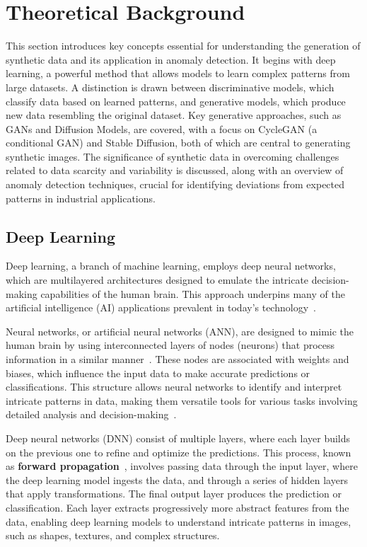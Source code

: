 \documentclass[12pt,DIV14,BCOR12mm,a4paper,footinclude=false,headinclude,parskip=half-,twoside,openright,cleardoublepage=empty,toc=index,bibliography=totoc,listof=totoc]{scrreprt}
\numberwithin{equation}{chapter}
\begin{document}
\chapter{Theoretical Background}
\label{chapter2}
This section introduces key concepts essential for understanding the generation of synthetic data and its application in anomaly detection. It begins with deep learning, a powerful method that allows models to learn complex patterns from large datasets. A distinction is drawn between discriminative models, which classify data based on learned patterns, and generative models, which produce new data resembling the original dataset. Key generative approaches, such as GANs and Diffusion Models, are covered, with a focus on CycleGAN (a conditional GAN) and Stable Diffusion, both of which are central to generating synthetic images. The significance of synthetic data in overcoming challenges related to data scarcity and variability is discussed, along with an overview of anomaly detection techniques, crucial for identifying deviations from expected patterns in industrial applications.
\section{Deep Learning}
Deep learning, a branch of machine learning, employs deep neural networks, which are multilayered architectures designed to emulate the intricate decision-making capabilities of the human brain. This approach underpins many of the artificial intelligence (AI) applications prevalent in today’s technology~\cite{wuttke2024}.

Neural networks, or artificial neural networks (ANN), are designed to mimic the human brain by using interconnected layers of nodes (neurons) that process information in a similar manner~\cite{maind2014research}. These nodes are associated with weights and biases, which influence the input data to make accurate predictions or classifications. This structure allows neural networks to identify and interpret intricate patterns in data, making them versatile tools for various tasks involving detailed analysis and decision-making~\cite{hardesty2017explained, maind2014research}.

Deep neural networks (DNN) consist of multiple layers, where each layer builds on the previous one to refine and optimize the predictions. This process, known as \textbf{forward propagation}~\cite{luhaniwal2019}, involves passing data through the input layer, where the deep learning model ingests the data, and through a series of hidden layers that apply transformations. The final output layer produces the prediction or classification. Each layer extracts progressively more abstract features from the data, enabling deep learning models to understand intricate patterns in images, such as shapes, textures, and complex structures.
\end{document}
